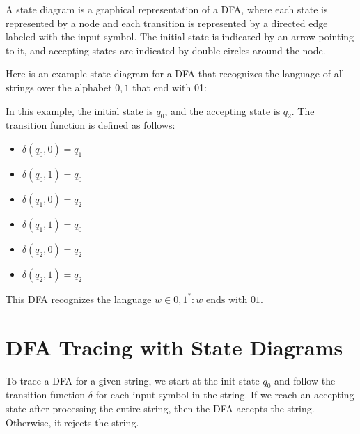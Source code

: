 \documentclass{article}
\begin{document}
A state diagram is a graphical representation of a DFA, where each state is represented by a node and each transition is represented by a directed edge labeled with the input symbol. The initial state is indicated by an arrow pointing to it, and accepting states are indicated by double circles around the node.

Here is an example state diagram for a DFA that recognizes the language of all strings over the alphabet ${0,1}$ that end with 01:

\begin{center}
\end{center}

In this example, the initial state is $q_0$, and the accepting state is $q_2$. The transition function is defined as follows:

\begin{itemize}
\item $\delta(q_0,0) = q_1$
\item $\delta(q_0,1) = q_0$
\item $\delta(q_1,0) = q_2$
\item $\delta(q_1,1) = q_0$
\item $\delta(q_2,0) = q_2$
\item $\delta(q_2,1) = q_2$
\end{itemize}

This DFA recognizes the language ${w \in {0,1}^* : w \text{ ends with } 01}$.

\section{DFA Tracing with State Diagrams}

To trace a DFA for a given string, we start at the init state $q_0$ and follow the transition function $\delta$ for each input symbol in the string. If we reach an accepting state after processing the entire string, then the DFA accepts the string. Otherwise, it rejects the string.
\end{document}
